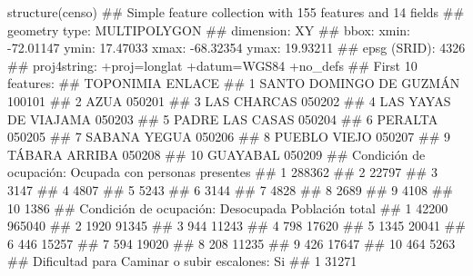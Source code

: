 \documentclass[11pt,]{article}
\newenvironment{Shaded}{\begin{snugshade}}{\end{snugshade}}
\newcommand{\StringTok}[1]{\textcolor[rgb]{0.31,0.60,0.02}{#1}}
\begin{document}
\begin{Shaded}
\begin{Highlighting}[]
{{{{\StringTok{structure(censo)}
\StringTok{## Simple feature collection with 155 features and 14 fields}
\StringTok{## geometry type:  MULTIPOLYGON}
\StringTok{## dimension:      XY}
\StringTok{## bbox:           xmin: -72.01147 ymin: 17.47033 xmax: -68.32354 ymax: 19.93211}
\StringTok{## epsg (SRID):    4326}
\StringTok{## proj4string:    +proj=longlat +datum=WGS84 +no_defs}
\StringTok{## First 10 features:}
\StringTok{##                  TOPONIMIA ENLACE}
\StringTok{## 1  SANTO DOMINGO DE GUZMÁN 100101}
\StringTok{## 2                     AZUA 050201}
\StringTok{## 3              LAS CHARCAS 050202}
\StringTok{## 4     LAS YAYAS DE VIAJAMA 050203}
\StringTok{## 5          PADRE LAS CASAS 050204}
\StringTok{## 6                  PERALTA 050205}
\StringTok{## 7             SABANA YEGUA 050206}
\StringTok{## 8             PUEBLO VIEJO 050207}
\StringTok{## 9            TÁBARA ARRIBA 050208}
\StringTok{## 10                GUAYABAL 050209}
\StringTok{##    Condición de ocupación: Ocupada con personas presentes}
\StringTok{## 1                                                  288362}
\StringTok{## 2                                                   22797}
\StringTok{## 3                                                    3147}
\StringTok{## 4                                                    4807}
\StringTok{## 5                                                    5243}
\StringTok{## 6                                                    3144}
\StringTok{## 7                                                    4828}
\StringTok{## 8                                                    2689}
\StringTok{## 9                                                    4108}
\StringTok{## 10                                                   1386}
\StringTok{##    Condición de ocupación: Desocupada Población total}
\StringTok{## 1                               42200          965040}
\StringTok{## 2                                1920           91345}
\StringTok{## 3                                 944           11243}
\StringTok{## 4                                 798           17620}
\StringTok{## 5                                1345           20041}
\StringTok{## 6                                 446           15257}
\StringTok{## 7                                 594           19020}
\StringTok{## 8                                 208           11235}
\StringTok{## 9                                 426           17647}
\StringTok{## 10                                464            5263}
\StringTok{##    Dificultad para Caminar o subir escalones: Si}
\StringTok{## 1                                          31271}
}}}}
\end{Highlighting}
\end{Shaded}
\end{document}
